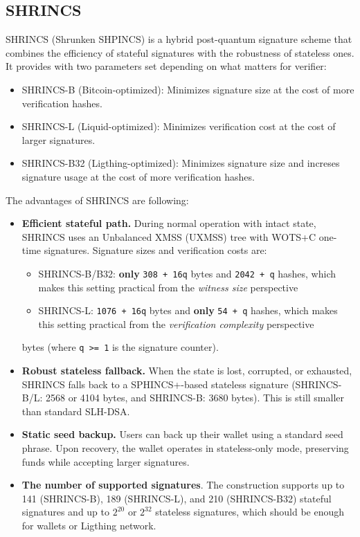 \subsection{SHRINCS} 
SHRINCS (Shrunken SHPINCS) is a hybrid post-quantum signature scheme that combines the efficiency of stateful signatures with the robustness of stateless ones. It provides with two parameters set depending on what matters for verifier:
    \begin{itemize}
        \item SHRINCS-B (Bitcoin-optimized): Minimizes signature size at the cost of more verification hashes.
        \item SHRINCS-L (Liquid-optimized): Minimizes verification cost at the cost of larger signatures.
        \item SHRINCS-B32 (Ligthing-optimized): Minimizes signature size and increses signature usage at the cost of more verification hashes.
    \end{itemize}
The advantages of SHRINCS are following: 
\begin{itemize}
    \item \textbf{Efficient stateful path.} During normal operation with intact state, SHRINCS uses an Unbalanced XMSS (UXMSS) tree with WOTS+C one-time signatures. Signature sizes and verification costs are:
    \begin{itemize}
        \item SHRINCS-B/B32: \textbf{only} \texttt{308 + 16q} bytes and \texttt{2042 + q} hashes, which makes this setting practical from the \textit{witness size} perspective
        \item SHRINCS-L: \texttt{1076 + 16q} bytes and \textbf{only} \texttt{54 + q} hashes, which makes this setting practical from the \textit{verification complexity} perspective
    \end{itemize} 
    bytes (where \texttt{q >= 1} is the signature counter).
    \item \textbf{Robust stateless fallback.} When the state is lost, corrupted, or exhausted, SHRINCS falls back to a SPHINCS+-based stateless signature (SHRINCS-B/L: 2568 or 4104 bytes, and SHRINCS-B: 3680 bytes). This is still smaller than standard SLH-DSA.
    \item \textbf{Static seed backup.} Users can back up their wallet using a standard seed phrase. Upon recovery, the wallet operates in stateless-only mode, preserving funds while accepting larger signatures.
    \item \textbf{The number of supported signatures}. The construction supports up to 141 (SHRINCS-B), 189 (SHRINCS-L), and 210 (SHRINCS-B32) stateful signatures and up to $2^{20}$ or $2^{32}$ stateless signatures, which should be enough for wallets or Ligthing network.
\end{itemize}

